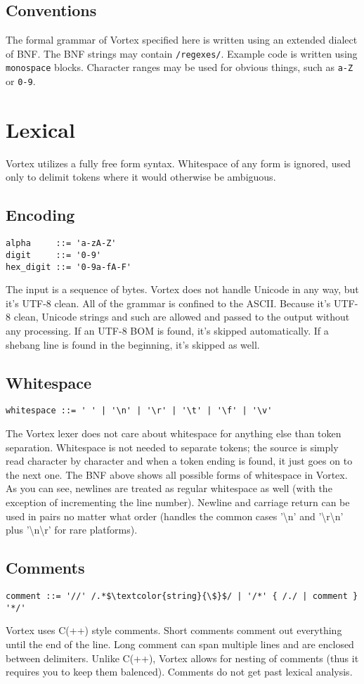 \documentclass{article}
\begin{document}
\subsection{Conventions}
The formal grammar of Vortex specified here is written using an extended dialect of BNF. The BNF strings may contain \verb|/regexes/|. Example code is written using \verb|monospace| blocks. Character ranges may be used for obvious things, such as \verb|a-Z| or \verb|0-9|.

\section{Lexical}
Vortex utilizes a fully free form syntax. Whitespace of any form is ignored, used only to delimit tokens where it would otherwise be ambiguous.
\subsection{Encoding}
\begin{lstlisting}[language=bnf]
alpha     ::= 'a-zA-Z'
digit     ::= '0-9'
hex_digit ::= '0-9a-fA-F'
\end{lstlisting}
The input is a sequence of bytes. Vortex does not handle Unicode in any way, but it's UTF-8 clean. All of the grammar is confined to the ASCII. Because it's UTF-8 clean, Unicode strings and such are allowed and passed to the output without any processing. If an UTF-8 BOM is found, it's skipped automatically. If a shebang line is found in the beginning, it's skipped as well.
\subsection{Whitespace}
\begin{lstlisting}[language=bnf]
whitespace ::= ' ' | '\n' | '\r' | '\t' | '\f' | '\v'
\end{lstlisting}
The Vortex lexer does not care about whitespace for anything else than token separation. Whitespace is not needed to separate tokens; the source is simply read character by character and when a token ending is found, it just goes on to the next one. The BNF above shows all possible forms of whitespace in Vortex. As you can see, newlines are treated as regular whitespace as well (with the exception of incrementing the line number). Newline and carriage return can be used in pairs no matter what order (handles the common cases '\textbackslash n' and '\textbackslash r\textbackslash n' plus '\textbackslash n\textbackslash r' for rare platforms).
\subsection{Comments}
\begin{lstlisting}[language=bnf,mathescape]
    comment ::= '//' /.*$\textcolor{string}{\$}$/ | '/*' { /./ | comment } '*/'
\end{lstlisting}
Vortex uses C(++) style comments. Short comments comment out everything until the end of the line. Long comment can span multiple lines and are enclosed between delimiters. Unlike C(++), Vortex allows for nesting of comments (thus it requires you to keep them balenced). Comments do not get past lexical analysis.
\end{document}
